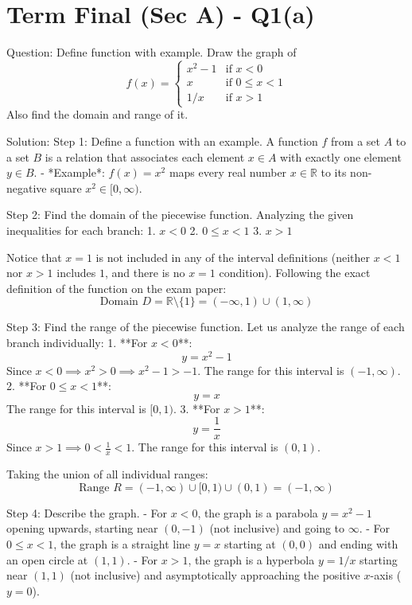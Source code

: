 \documentclass[11pt, a4paper]{article}
\begin{document}

\section*{Term Final (Sec A) - Q1(a)}
Question:
Define function with example. Draw the graph of
$$f(x) = \begin{cases} 
      x^2 - 1 & \text{if } x < 0 \\
      x & \text{if } 0 \le x < 1 \\
      1/x & \text{if } x > 1 
   \end{cases}$$
Also find the domain and range of it.

Solution:
Step 1: Define a function with an example.
A function $f$ from a set $A$ to a set $B$ is a relation that associates each element $x \in A$ with exactly one element $y \in B$.
- *Example*: $f(x) = x^2$ maps every real number $x \in \mathbb{R}$ to its non-negative square $x^2 \in [0, \infty)$.

Step 2: Find the domain of the piecewise function.
Analyzing the given inequalities for each branch:
1. $x < 0$
2. $0 \le x < 1$
3. $x > 1$

Notice that $x = 1$ is not included in any of the interval definitions (neither $x < 1$ nor $x > 1$ includes $1$, and there is no $x = 1$ condition). Following the exact definition of the function on the exam paper:
$$\text{Domain } D = \mathbb{R} \setminus \{1\} = (-\infty, 1) \cup (1, \infty)$$

Step 3: Find the range of the piecewise function.
Let us analyze the range of each branch individually:
1. **For $x < 0$**:
   $$y = x^2 - 1$$
   Since $x < 0 \implies x^2 > 0 \implies x^2 - 1 > -1$.
   The range for this interval is $(-1, \infty)$.
2. **For $0 \le x < 1$**:
   $$y = x$$
   The range for this interval is $[0, 1)$.
3. **For $x > 1$**:
   $$y = \frac{1}{x}$$
   Since $x > 1 \implies 0 < \frac{1}{x} < 1$.
   The range for this interval is $(0, 1)$.

Taking the union of all individual ranges:
$$\text{Range } R = (-1, \infty) \cup [0, 1) \cup (0, 1) = (-1, \infty)$$

Step 4: Describe the graph.
- For $x < 0$, the graph is a parabola $y = x^2-1$ opening upwards, starting near $(0, -1)$ (not inclusive) and going to $\infty$.
- For $0 \le x < 1$, the graph is a straight line $y = x$ starting at $(0,0)$ and ending with an open circle at $(1,1)$.
- For $x > 1$, the graph is a hyperbola $y = 1/x$ starting near $(1,1)$ (not inclusive) and asymptotically approaching the positive $x$-axis ($y = 0$).
\end{document}
